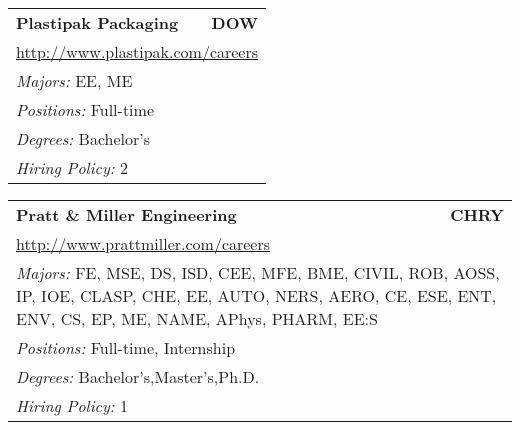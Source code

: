 \documentclass[twoside]{article}
\begin{document}
\begin{center}
\begin{multicols}{3}
\begin{FlushLeft}
\begin{minipage}{.9\columnwidth}
\end{minipage}
 
\begin{minipage}{.9\columnwidth}\begin{tabularx}{.95\columnwidth}{Xr}
                 {\Large\bf Plastipak Packaging} & {\Large\bf DOW}\\
    \multicolumn{2}{p{.95\columnwidth}}{\url{http://www.plastipak.com/careers}}\\
    \multicolumn{2}{p{.95\columnwidth}}{\emph{Majors:} EE, ME}\\
    \multicolumn{2}{p{.95\columnwidth}}{\emph{Positions:} Full-time}\\
    \multicolumn{2}{p{.95\columnwidth}}{\emph{Degrees:} Bachelor's}\\
    \multicolumn{2}{p{.95\columnwidth}}{\emph{Hiring Policy:} 2}\\
    \end{tabularx}
    
\end{minipage}
 
\begin{minipage}{.9\columnwidth}\begin{tabularx}{.95\columnwidth}{Xr}
                 {\Large\bf Pratt \& Miller Engineering} & {\Large\bf CHRY}\\
    \multicolumn{2}{p{.95\columnwidth}}{\url{http://www.prattmiller.com/careers}}\\
    \multicolumn{2}{p{.95\columnwidth}}{\emph{Majors:} FE, MSE, DS, ISD, CEE, MFE, BME, CIVIL, ROB, AOSS, IP, IOE, CLASP, CHE, EE, AUTO, NERS, AERO, CE, ESE, ENT, ENV, CS, EP, ME, NAME, APhys, PHARM, EE:S}\\
    \multicolumn{2}{p{.95\columnwidth}}{\emph{Positions:} Full-time, Internship}\\
    \multicolumn{2}{p{.95\columnwidth}}{\emph{Degrees:} Bachelor's,Master's,Ph.D.}\\
    \multicolumn{2}{p{.95\columnwidth}}{\emph{Hiring Policy:} 1}\\
    \end{tabularx}
    
\end{minipage}
 

\end{FlushLeft}
\end{multicols}
\end{center}
\end{document}
